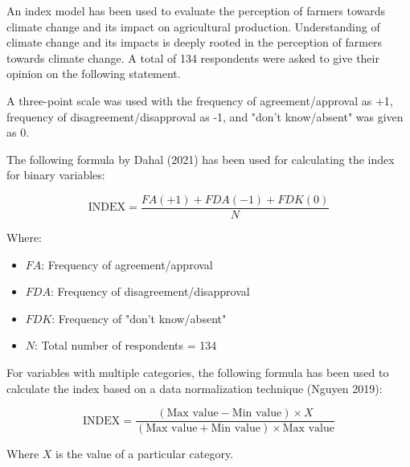 An index model has been used to evaluate the perception of farmers towards climate change and its impact on agricultural production. Understanding of climate change and its impacts is deeply rooted in the perception of farmers towards climate change. A total of 134 respondents were asked to give their opinion on the following statement.

A three-point scale was used with the frequency of agreement/approval as +1, frequency of disagreement/disapproval as -1, and "don’t know/absent" was given as 0.

The following formula by Dahal (2021) has been used for calculating the index for binary variables:

\[
\text{INDEX} = \frac{FA(+1) + FDA(-1) + FDK(0)}{N}
\]

Where:
\begin{itemize}
    \item $FA$: Frequency of agreement/approval
    \item $FDA$: Frequency of disagreement/disapproval
    \item $FDK$: Frequency of "don’t know/absent"
    \item $N$: Total number of respondents = 134
\end{itemize}

For variables with multiple categories, the following formula has been used to calculate the index based on a data normalization technique (Nguyen 2019):

\[
\text{INDEX} = \frac{(\text{Max value} - \text{Min value}) \times X}{(\text{Max value} + \text{Min value}) \times \text{Max value}}
\]

Where $X$ is the value of a particular category.